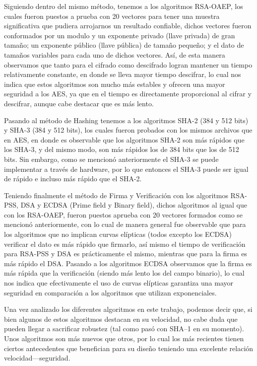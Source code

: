 \documentclass[onecolumn]{IEEEtran}
\begin{document}
Siguiendo dentro del mismo método, tenemos a los algoritmos RSA-OAEP, los cuales fueron puestos a prueba con 20 vectores para tener una muestra significativa que pudiera arrojarnos un resultado confiable, dichos vectores fueron conformados por un modulo y un exponente privado (llave privada) de gran tamaño; un exponente público (llave pública) de tamaño pequeño; y el dato de tamaños variables para cada uno de dichos vectores. Así, de esta manera observamos que tanto para el cifrado como descifrado logran mantener un tiempo relativamente constante, en donde se lleva mayor tiempo descifrar, lo cual nos indica que estos algoritmos son mucho más estables y ofrecen una mayor seguridad a los AES, ya que en el tiempo es directamente proporcional al cifrar y descifrar, aunque cabe destacar que es más lento.

Pasando al método de Hashing tenemos a los algoritmos SHA-2 (384 y 512 bits) y SHA-3 (384 y 512 bits), los cuales fueron probados con los mismos archivos que en AES, en donde es observable que los algoritmos SHA-2 son más rápidos que los SHA-3, y del mismo modo, son más rápidos los de 384 bits que los de 512 bits. Sin embargo, como se mencionó anteriormente el SHA-3 se puede implementar a través de hardware, por lo que entonces el SHA-3 puede ser igual de rápido e incluso más rápido que el SHA-2.

Teniendo finalmente el método de Firma y Verificación con los algoritmos RSA-PSS, DSA y ECDSA (Prime field y Binary field), dichos algoritmos al igual que con los RSA-OAEP, fueron puestos aprueba con 20 vectores formados como se mencionó anteriormente, con lo cual de manera general fue observable que para los algoritmos que no implican curvas elípticas (todos excepto los ECDSA) verificar el dato es más rápido que firmarlo, así mismo el tiempo de verificación para RSA-PSS y DSA es prácticamente el mismo, mientras que para la firma es más rápido el DSA. Pasando a los algoritmos ECDSA observamos que la firma es más rápida que la verificación (siendo más lento los del campo binario), lo cual nos indica que efectivamente el uso de curvas elípticas garantiza una mayor seguridad en comparación a los algoritmos que utilizan exponenciales.

Una vez analizado los diferentes algoritmos en este trabajo, podemos decir que, si bien algunos de estos algoritmos destacan en su velocidad, no cabe duda que pueden llegar a sacrificar robustez (tal como pasó con SHA–1 en su momento). Unos algoritmos son más nuevos que otros, por lo cual los más recientes tienen ciertos antecedentes que benefician para su diseño teniendo una excelente relación velocidad—seguridad.
\end{document}
